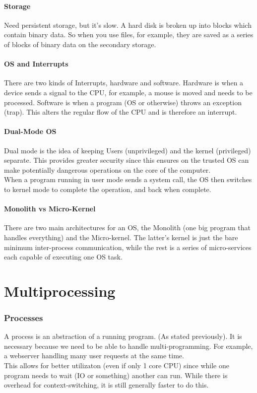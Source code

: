 \documentclass[12pt]{article}
\theoremstyle{definition}
\begin{document}
\subsection{Storage}
Need persistent storage, but it's slow. A hard disk is broken up into blocks which contain binary data. So when you use files, for example, they are saved as a series of blocks of binary data on the secondary storage.

\subsection{OS and Interrupts}
There are two kinds of Interrupts, hardware and software. Hardware is when a device sends a signal to the CPU, for example, a mouse is moved and needs to be processed. Software is when a program (OS or otherwise) throws an exception (trap). This alters the regular flow of the CPU and is therefore an interrupt.

\subsection{Dual-Mode OS}
Dual mode is the idea of keeping Users (unprivileged) and the kernel (privileged) separate. This provides greater security since this ensures on the trusted OS can make potentially dangerous operations on the core of the computer. 
\\ \linebreak
When a program running in user mode sends a system call, the OS then switches to kernel mode to complete the operation, and back when complete.
\\ \linebreak

\subsection{Monolith vs Micro-Kernel}
There are two main architectures for an OS, the Monolith (one big program that handles everything) and the Micro-kernel. The latter's kernel is just the bare minimum inter-process communication, while the rest is a series of micro-services each capable of executing one OS task.

\part{Multiprocessing}
\section{Processes}
A process is an abstraction of a running program. (As stated previously). It is necessary because we need to be able to handle multi-programming. For example, a webserver handling many user requests at the same time.
\\ \linebreak
This allows for better utilizaton (even if only 1 core CPU) since while one program needs to wait (IO or something) another can run. While there is overhead for context-switching, it is still generally faster to do this.
\end{document}
